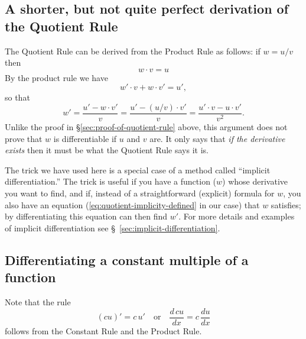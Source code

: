 \subsection{A shorter, but not quite perfect derivation of the Quotient Rule}
The Quotient Rule can be derived from the Product Rule as follows:
if $w=u/v$ then 
\begin{equation}\label{eq:quotient-implicity-defined}
  w\cdot v=u
\end{equation}
By the product rule we have
\[
w'\cdot v+w\cdot v'=u',
\]
so that
\[
w' = \frac{u'-w\cdot v'}{v}
= \frac{u'-(u/v)\cdot v'}{v}
=\frac{u'\cdot v-u\cdot v'}{v^2}.
\]
Unlike the proof in \S\ref{sec:proof-of-quotient-rule} above, this argument does
not prove that $w$ is differentiable if $u$ and $v$ are.
It only says that \emph{if the derivative exists} then it must be what the
Quotient Rule says it is.

The trick we have used here is a special case of a method called ``implicit
differentiation.''  The trick is useful if you have a function ($w$) whose
derivative you want to find, and if, instead of a straightforward (explicit)
formula for $w$, you also have an equation
(\eqref{eq:quotient-implicity-defined} in our case) that $w$ satisfies; by
differentiating this equation can then find $w'$.  For more details and examples
of implicit differentiation see \S~\ref{sec:implicit-differentiation}.

\subsection{Differentiating a constant multiple of a function}
\label{par:derivative-of-constant-multiple}
Note that the rule
\[
(cu)'=c\,u'
\quad\text{or}\quad
\frac{d\,cu} {dx} = c\, \frac{du} {dx}
\]
follows from the Constant Rule and the Product Rule.

